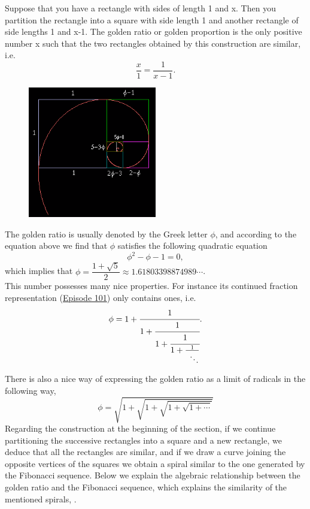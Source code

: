 

Suppose that you have a rectangle with sides of length 1 and x. Then you partition the rectangle into a square with side length 1 and another rectangle of side lengths 1 and x-1. The \textcolor{CornellRed}{golden ratio} or \textcolor{CornellRed}{golden proportion} is the only positive number x such that the two rectangles obtained by this construction are similar, i.e.
	\[
	\frac{x}{1}= \frac{1}{x-1}.
	\]

	\begin{figure}[H]
	\centering
	\includegraphics[width=0.5\textwidth]{../sections/seasons/season1/102/images/spiral2.png} 
	\end{figure}
The golden ratio is usually denoted by the Greek letter $\phi$, and according to the equation above we find that $\phi$ satisfies the following quadratic equation
	\[
	\phi^2 - \phi - 1 = 0,
	\]
which implies that $\phi= \dfrac{1 + \sqrt{5}}{2} \approx 1.61803398874989\cdots$. \\


This number possesses many nice properties. For instance its continued fraction representation (\hyperref[ep101]{Episode 101}) only contains ones, i.e.
	\[
	\phi= 1 +  \cfrac{1}{1 + \cfrac{1}{1 + \cfrac{1}{1 + \frac{1}{\;\;\ddots}}}}.
	\]




There is also a nice way of expressing the golden ratio as a limit of radicals in the following way,
	\[
	\phi= \sqrt{1+\sqrt{1+\sqrt{1+\sqrt{1+\cdots}}}}
	\]
Regarding the construction at the beginning of the section, if we continue partitioning the successive rectangles into a square and a new rectangle, we deduce that all the rectangles are similar, and if we draw a curve joining the opposite vertices of the squares we obtain a spiral similar to the one generated by the Fibonacci sequence. Below we explain the algebraic relationship between the golden ratio and the Fibonacci sequence, which explains the similarity of the mentioned spirals, . 


